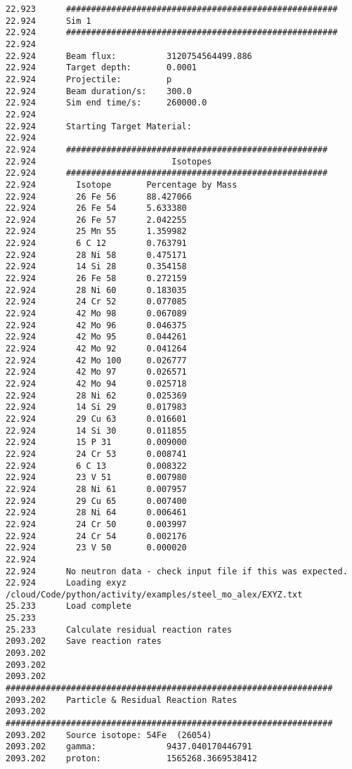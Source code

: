 \begin{lstlisting}[style=sOutputFile,caption={Final results for steel irradiation},label={listing:alexsteel}]
22.923      ######################################################
22.924      Sim 1
22.924      ######################################################
22.924      
22.924      Beam flux:          3120754564499.886
22.924      Target depth:       0.0001
22.924      Projectile:         p
22.924      Beam duration/s:    300.0
22.924      Sim end time/s:     260000.0
22.924      
22.924      Starting Target Material:
22.924      
22.924      ####################################################
22.924                           Isotopes                       
22.924      ####################################################
22.924        Isotope       Percentage by Mass  
22.924        26 Fe 56      88.427066
22.924        26 Fe 54      5.633380
22.924        26 Fe 57      2.042255
22.924        25 Mn 55      1.359982
22.924        6 C 12        0.763791
22.924        28 Ni 58      0.475171
22.924        14 Si 28      0.354158
22.924        26 Fe 58      0.272159
22.924        28 Ni 60      0.183035
22.924        24 Cr 52      0.077085
22.924        42 Mo 98      0.067089
22.924        42 Mo 96      0.046375
22.924        42 Mo 95      0.044261
22.924        42 Mo 92      0.041264
22.924        42 Mo 100     0.026777
22.924        42 Mo 97      0.026571
22.924        42 Mo 94      0.025718
22.924        28 Ni 62      0.025369
22.924        14 Si 29      0.017983
22.924        29 Cu 63      0.016601
22.924        14 Si 30      0.011855
22.924        15 P 31       0.009000
22.924        24 Cr 53      0.008741
22.924        6 C 13        0.008322
22.924        23 V 51       0.007980
22.924        28 Ni 61      0.007957
22.924        29 Cu 65      0.007400
22.924        28 Ni 64      0.006461
22.924        24 Cr 50      0.003997
22.924        24 Cr 54      0.002176
22.924        23 V 50       0.000020
22.924      
22.924      No neutron data - check input file if this was expected.
22.924      Loading exyz /cloud/Code/python/activity/examples/steel_mo_alex/EXYZ.txt
25.233      Load complete
25.233      
25.233      Calculate residual reaction rates
2093.202    Save reaction rates
2093.202    
2093.202    
2093.202    #################################################################
2093.202    Particle & Residual Reaction Rates
2093.202    #################################################################
2093.202    Source isotope: 54Fe  (26054)
2093.202    gamma:              9437.040170446791
2093.202    proton:             1565268.3669538412

\end{lstlisting}
